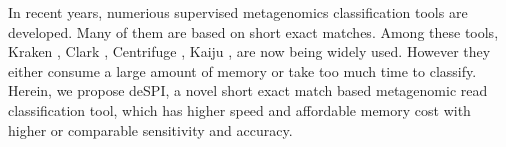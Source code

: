 \documentclass[a0,portrait, svgnames]{a0poster}
\begin{document}
\begin{multicols}{2}
In recent years, numerious supervised metagenomics classification tools are developed. Many of them are based on short exact matches. Among these tools, Kraken \cite{Wood2014-es}, Clark \cite{Ounit2015-fi}, Centrifuge \cite{Kim2016-zf}, Kaiju \cite{Menzel2016-mi}, are now being widely used. However they either consume a large amount of memory or take too much time to classify. Herein, we propose deSPI, a novel short exact match based metagenomic read classification tool, which has higher speed and affordable memory cost with higher or comparable sensitivity and accuracy. 


\color{DarkSlateGray} %

%



\end{multicols}
\end{document}
